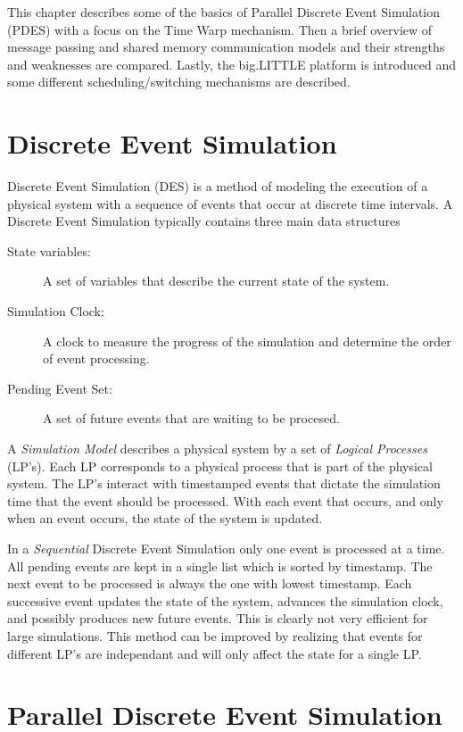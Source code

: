 \documentclass[11pt]{book}
\begin{document}
This chapter describes some of the basics of Parallel Discrete Event Simulation (PDES) with
a focus on the Time Warp mechanism. Then a brief overview of message passing and shared
memory communication models and their strengths and weaknesses are compared. Lastly, the
big.LITTLE platform is introduced and some different scheduling/switching mechanisms are
described.

\section{Discrete Event Simulation}

Discrete Event Simulation (DES) is a method of modeling the execution of a physical system
with a sequence of events that occur at discrete time intervals. A Discrete Event Simulation
typically contains three main data structures

\begin{description}
    \item[State variables: ] A set of variables that describe the current state of the system.
    \item[Simulation Clock: ] A clock to measure the progress of the simulation and determine
        the order of event processing.
    \item[Pending Event Set: ] A set of future events that are waiting to be procesed.
\end{description}

\noindent
A \emph{Simulation Model} describes a physical system by a set of \emph{Logical Processes}
(LP's). Each LP corresponds to a physical process that is part of the physical system. The
LP's interact with timestamped events that dictate the simulation time that the event should
be processed. With each event that occurs, and only when an event occurs, the state of the
system is updated.

In a \emph{Sequential} Discrete Event Simulation only one event is processed at a time.
All pending events are kept in a single list which is sorted by timestamp. The next event
to be processed is always the one with lowest timestamp. Each successive event updates the
state of the system, advances the simulation clock, and possibly produces new future events.
This is clearly not very efficient for large simulations. This method can be improved by
realizing that events for different LP's are independant and will only affect the state for
a single LP.

\section{Parallel Discrete Event Simulation}
\end{document}
